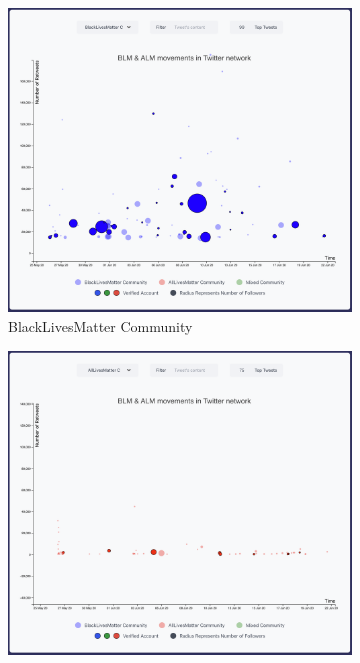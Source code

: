 \begin{figure}[H]
\begin{subfigure}{.5\textwidth}
  \centering
  \captionsetup{justification=centering}
  \includegraphics[width=1\linewidth]{Report-latex/tex_files/pics/example/eblm.png}  
  \caption{BlackLivesMatter Community}
  \label{fig:sub-first}
\end{subfigure}
\begin{subfigure}{.5\textwidth}
  \centering
  \captionsetup{justification=centering}
  \includegraphics[width=1\linewidth]{Report-latex/tex_files/pics/example/ealm.png}  

\end{subfigure}
\end{figure}
